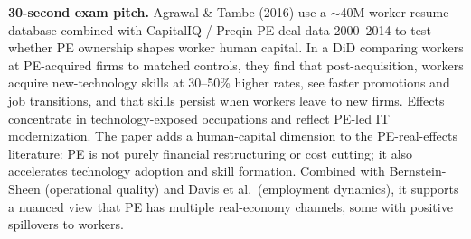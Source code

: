 \documentclass[11pt]{article}
\begin{document}
\begin{keybox}
\textbf{30-second exam pitch.} Agrawal \& Tambe (2016) use a $\sim$40M-worker resume database combined with CapitalIQ / Preqin PE-deal data 2000--2014 to test whether PE ownership shapes worker human capital. In a DiD comparing workers at PE-acquired firms to matched controls, they find that post-acquisition, workers acquire new-technology skills at 30--50\% higher rates, see faster promotions and job transitions, and that skills persist when workers leave to new firms. Effects concentrate in technology-exposed occupations and reflect PE-led IT modernization. The paper adds a human-capital dimension to the PE-real-effects literature: PE is not purely financial restructuring or cost cutting; it also accelerates technology adoption and skill formation. Combined with Bernstein-Sheen (operational quality) and Davis et al.\ (employment dynamics), it supports a nuanced view that PE has multiple real-economy channels, some with positive spillovers to workers.
\end{keybox}
\end{document}
